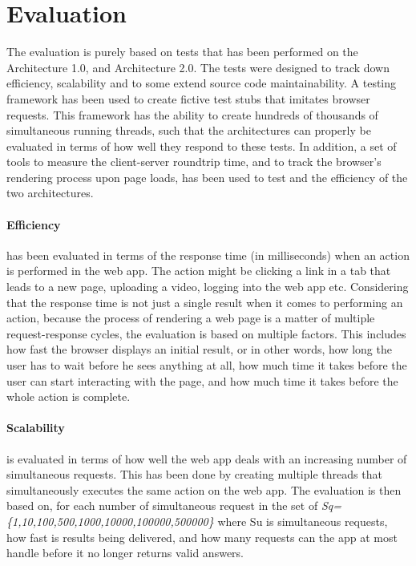 \section{Evaluation}
The evaluation is purely based on tests that has been performed on the Architecture 1.0, and Architecture 2.0. The tests were designed to track down efficiency, scalability and to some extend source code maintainability. A testing framework has been used to create fictive test stubs that imitates browser requests. This framework has the ability to create hundreds of thousands of simultaneous running threads, such that the architectures can properly be evaluated in terms of how well they respond to these tests. In addition, a set of tools to measure the client-server roundtrip time, and to track the browser's rendering process upon page loads, has been used to test and the efficiency of the two architectures. 

\paragraph{Efficiency} has been evaluated in terms of the response time (in milliseconds) when an action is performed in the web app. The action might be clicking a link in a tab that leads to a new page, uploading a video, logging into the web app etc. Considering that the response time is not just a single result when it comes to performing an action, because the process of rendering a web page is a matter of multiple request-response cycles, the evaluation is based on multiple factors. This includes how fast the browser displays an initial result, or in other words, how long the user has to wait before he sees anything at all, how much time it takes before the user can start interacting with the page, and how much time it takes before the whole action is complete. 

\paragraph{Scalability} is evaluated in terms of how well the web app deals with an increasing number of simultaneous requests. This has been done by creating multiple threads that simultaneously executes the same action on the web app. The evaluation is then based on, for each number of simultaneous request in the set of \textit{Sq=\{1,10,100,500,1000,10000,100000,500000\}} where Su is simultaneous requests, how fast is results being delivered, and how many requests can the app at most handle before it no longer returns valid answers. 


